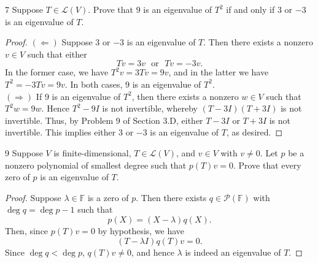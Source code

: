 \documentclass{extarticle}
\newenvironment{problem}[1]{\begin{prob*}{#1}{}}{\end{prob*}}
\newcommand{\F}{\mathbb{F}}
\newcommand{\poly}{\mathcal{P}}
\newcommand{\Hom}{\mathcal{L}}
\begin{document}
\begin{problem}{7}
Suppose $T\in\Hom(V)$.  Prove that $9$ is an eigenvalue of $T^2$ if and only if $3$ or $-3$ is an eigenvalue of $T$.
\end{problem}
\begin{proof}
$(\Leftarrow)$ Suppose $3$ or $-3$ is an eigenvalue of $T$.  Then there exists a nonzero $v\in V$ such that either 
\begin{equation*}
Tv = 3v ~~~\text{or}~~~ Tv = -3v.
\end{equation*}
In the former case, we have $T^2v = 3Tv = 9v$, and in the latter we have $T^2 = -3Tv = 9v$.  In both cases, $9$ is an eigenvalue of $T^2$.\\
\indent $(\Rightarrow)$ If $9$ is an eigenvalue of $T^2$, then there exists a nonzero $w\in V$ such that $T^2w = 9w$.  Hence $T^2 - 9I$ is not invertible, whereby $(T - 3I)(T + 3I)$ is not invertible.  Thus, by Problem 9 of Section 3.D, either $T-3I$ or $T+3I$ is not invertible.  This implies either $3$ or $-3$ is an eigenvalue of $T$, as desired.
\end{proof}

\begin{problem}{9}
Suppose $V$ is finite-dimensional, $T\in\Hom(V)$, and $v\in V$ with $v\neq 0$.  Let $p$ be a nonzero polynomial of smallest degree such that $p(T)v = 0$.  Prove that every zero of $p$ is an eigenvalue of $T$.
\end{problem}
\begin{proof}
Suppose $\lambda\in\F$ is a zero of $p$.  Then there exists $q\in\poly(\F)$ with $\deg q = \deg p - 1$ such that 
\begin{equation*}
p(X) = (X - \lambda)q(X).
\end{equation*}
Then, since $p(T)v = 0$ by hypothesis, we have
\begin{equation*}
(T - \lambda I)q(T)v = 0.
\end{equation*}
Since $\deg q < \deg p$, $q(T)v\neq 0$, and hence $\lambda$ is indeed an eigenvalue of $T$.
\end{proof}
\end{document}
